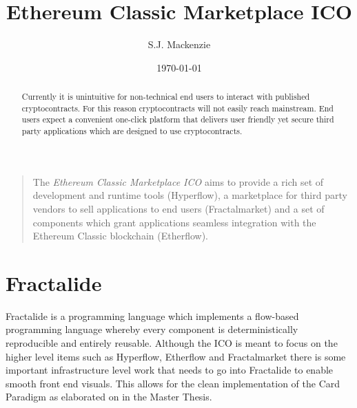 \documentclass[%
 aip,
 jmp,%
 amsmath,amssymb,
 reprint,%
]{revtex4-1}
\begin{document}

\title[Ethereum Classic Marketplace ICO]{Ethereum Classic Marketplace ICO}%


\author{S.J. Mackenzie}%

\date{\today}%

\begin{abstract}

Currently it is unintuitive for non-technical end users to interact with published cryptocontracts. For this reason cryptocontracts will not easily reach mainstream. End users expect a convenient one-click platform that delivers user friendly yet secure third party applications which are designed to use cryptocontracts.
\end{abstract}

\maketitle

\begin{quotation}
The \textit{Ethereum Classic Marketplace ICO} aims to provide a rich set of development and runtime tools (Hyperflow), a marketplace for third party vendors to sell applications to end users (Fractalmarket) and a set of components which grant applications seamless integration with the Ethereum Classic blockchain (Etherflow).

\end{quotation}

\section{\label{sec:level1}Fractalide}
Fractalide is a programming language which implements a flow-based programming language whereby every component is deterministically reproducible and entirely reusable. Although the ICO is meant to focus on the higher level items such as Hyperflow, Etherflow and Fractalmarket there is some important infrastructure level work that needs to go into Fractalide to enable smooth front end visuals. This allows for the clean implementation of the Card Paradigm as elaborated on in the Master Thesis.
\end{document}
